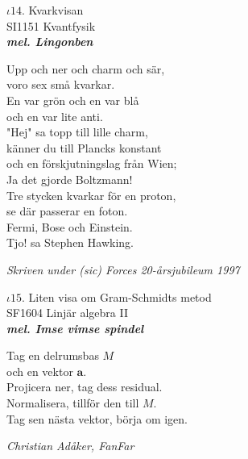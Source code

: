 \documentclass[a6paper,10pt]{article}
\newcommand{\mel}[1]{\small\textbf{\textit{mel. #1 \\}}}
\begin{document}
\setlength{\oddsidemargin}{-0.37in}
\noindent
\begin{center}
\Large $\iota14$. Kvarkvisan \\ 
\footnotesize SI1151 Kvantfysik\\
\mel{Lingonben}
\end{center}
Upp och ner och charm och sär, \\
voro sex små kvarkar. \\
En var grön och en var blå \\
och en var lite anti. 
\vspace{5pt} \\
"Hej" sa topp till lille charm, \\
känner du till Plancks konstant \\
och en förskjutningslag från Wien; \\
Ja det gjorde Boltzmann! 
\vspace{5pt} \\
Tre stycken kvarkar för en proton, \\
se där passerar en foton. \\
Fermi, Bose och Einstein. \\
Tjo! sa Stephen Hawking. 
\begin{flushright}
\textit{Skriven under (sic) Forces 20-årsjubileum 1997}
\end{flushright}
\begin{center}
\Large $\iota15$. Liten visa om Gram-Schmidts metod \\ 
\footnotesize SF1604 Linjär algebra II\\
\mel{Imse vimse spindel}
\end{center}
Tag en delrumsbas $M$\\
och en vektor $\boldsymbol{a}$.\\
Projicera ner, tag dess residual.\\
Normalisera, tillför den till $M$.\\
Tag sen nästa vektor, börja om igen.
\begin{flushright}
\textit{Christian Adåker, FanFar}
\end{flushright}



\setlength{\oddsidemargin}{-0.47in}
\noindent
\end{document}
